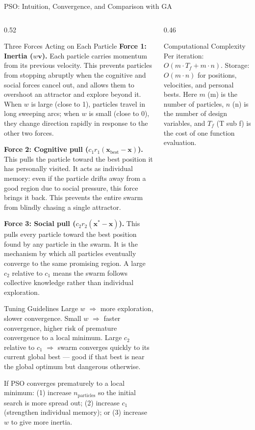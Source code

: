 \documentclass[aspectratio=169,10pt]{beamer}
\newcommand{\bx}{\mathbf{x}}
\newcommand{\bv}{\mathbf{v}}
\begin{document}
\begin{frame}[allowframebreaks]{PSO: Intuition, Convergence, and Comparison with GA}

  \begin{columns}[T]
    \begin{column}{0.52\textwidth}
      \begin{block}{Three Forces Acting on Each Particle}
        \textbf{Force 1: Inertia ($w\bv$).}
        Each particle carries momentum from its previous velocity.
        This prevents particles from stopping abruptly when the
        cognitive and social forces cancel out, and allows them to
        overshoot an attractor and explore beyond it.  When $w$
        is large (close to 1), particles travel in long sweeping arcs;
        when $w$ is small (close to 0), they change direction rapidly
        in response to the other two forces.

        \textbf{Force 2: Cognitive pull ($c_1 r_1 (\bx_{\text{best}} - \bx)$).}
        This pulls the particle toward the best position it has
        personally visited.  It acts as individual memory: even if
        the particle drifts away from a good region due to social
        pressure, this force brings it back.  This prevents the
        entire swarm from blindly chasing a single attractor.

        \textbf{Force 3: Social pull ($c_2 r_2 (\bx^* - \bx)$).}
        This pulls every particle toward the best position found by
        any particle in the swarm.  It is the mechanism by which all
        particles eventually converge to the same promising region.
        A large $c_2$ relative to $c_1$ means the swarm follows
        collective knowledge rather than individual exploration.
      \end{block}

      \medskip
      \begin{block}{Tuning Guidelines}
        Large $w$ $\Rightarrow$ more exploration, slower convergence.
        Small $w$ $\Rightarrow$ faster convergence, higher risk of
        premature convergence to a local minimum.
        Large $c_2$ relative to $c_1$ $\Rightarrow$ swarm converges
        quickly to its current global best --- good if that best is
        near the global optimum but dangerous otherwise.

        If PSO converges prematurely to a local minimum: (1) increase
        $n_{\text{particles}}$ so the initial search is more spread
        out; (2) increase $c_1$ (strengthen individual memory); or
        (3) increase $w$ to give more inertia.
      \end{block}
    \end{column}
    \begin{column}{0.46\textwidth}
      \begin{block}{Computational Complexity}
        Per iteration: $O(m \cdot T_f + m \cdot n)$.
        Storage: $O(m \cdot n)$ for positions, velocities, and
        personal bests.  Here $m$ (m) is the number of particles,
        $n$ (n) is the number of design variables, and $T_f$ (T sub f)
        is the cost of one function evaluation.


\end{block}
\end{column}
\end{columns}
\end{frame}
\end{document}

